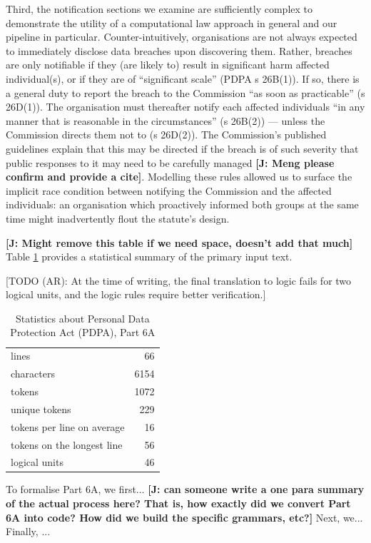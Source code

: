 \documentclass{IOS-Book-Article}
\newcommand{\todoj}[1]{{\color{red}\textbf{[J: #1]}}}
\begin{document}
Third, the notification sections we examine are sufficiently complex to demonstrate the utility of a computational law approach in general and our pipeline in particular. Counter-intuitively, organisations are not always expected to immediately disclose data breaches upon discovering them. Rather, breaches are only notifiable if they (are likely to) result in significant harm affected individual(s), or if they are of ``significant scale'' (PDPA s 26B(1)). If so, there is a general duty to report the breach to the Commission ``as soon as practicable'' (s 26D(1)). The organisation must thereafter notify each affected individuals ``in any manner that is reasonable in the circumstances'' (s 26B(2)) --- unless the Commission directs them not to (s 26D(2)). The Commission's published guidelines explain that this may be directed if the breach is of such severity that public responses to it may need to be carefully managed
 \todoj{ Meng please confirm and provide a cite}.
 Modelling these rules allowed us to surface the implicit race condition between notifying the Commission and the affected individuals: an organisation which proactively informed both groups at the same time might inadvertently flout the statute's design.

\todoj{Might remove this table if we need space, doesn't add that much}
Table \ref{stats} provides a statistical summary of the primary input text.

[TODO (AR): At the time of writing, the final translation to logic fails for two logical units, and the logic rules require better verification.]

\begin{table}
  \begin{tabular}{|l|r|}
\hline
lines & 66 \\
characters & 6154 \\
tokens & 1072 \\
unique tokens & 229 \\
tokens per line on average & 16 \\
tokens on the longest line & 56 \\
logical units & 46 \\
\hline
  \end{tabular}
  \caption{Statistics about Personal Data Protection Act (PDPA), Part 6A}
  \label{stats}
\end{table}

To formalise Part 6A, we first...
 \todoj{ can someone write a one para summary of the actual process here? That is, how exactly did we convert Part 6A into code? How did we build the specific grammars, etc?}
  Next, we... Finally, ...
\end{document}
